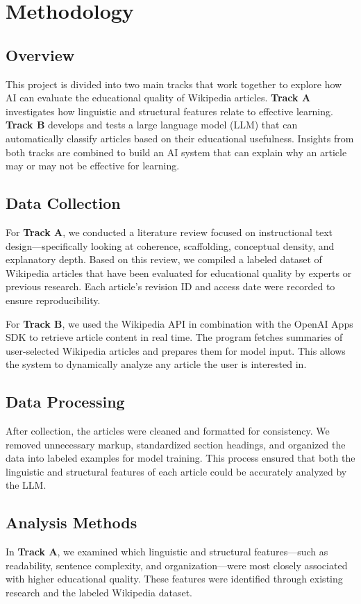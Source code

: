 \section{Methodology}
\label{sec:methodology}

\subsection{Overview}
This project is divided into two main tracks that work together to explore how AI can evaluate the educational quality of Wikipedia articles. \textbf{Track A} investigates how linguistic and structural features relate to effective learning. \textbf{Track B} develops and tests a large language model (LLM) that can automatically classify articles based on their educational usefulness. Insights from both tracks are combined to build an AI system that can explain why an article may or may not be effective for learning.

\subsection{Data Collection}
For \textbf{Track A}, we conducted a literature review focused on instructional text design—specifically looking at coherence, scaffolding, conceptual density, and explanatory depth. Based on this review, we compiled a labeled dataset of Wikipedia articles that have been evaluated for educational quality by experts or previous research. Each article’s revision ID and access date were recorded to ensure reproducibility.

For \textbf{Track B}, we used the Wikipedia API in combination with the OpenAI Apps SDK to retrieve article content in real time. The program fetches summaries of user-selected Wikipedia articles and prepares them for model input. This allows the system to dynamically analyze any article the user is interested in.

\subsection{Data Processing}
After collection, the articles were cleaned and formatted for consistency. We removed unnecessary markup, standardized section headings, and organized the data into labeled examples for model training. This process ensured that both the linguistic and structural features of each article could be accurately analyzed by the LLM.

\subsection{Analysis Methods}
In \textbf{Track A}, we examined which linguistic and structural features—such as readability, sentence complexity, and organization—were most closely associated with higher educational quality. These features were identified through existing research and the labeled Wikipedia dataset.

